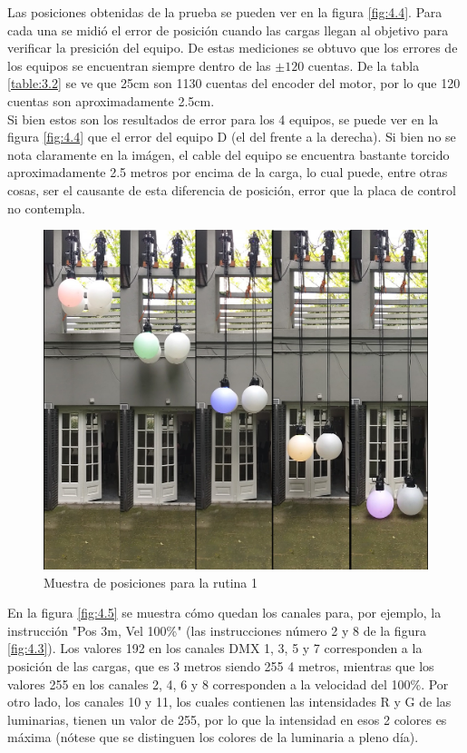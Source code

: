 Las posiciones obtenidas de la prueba se pueden ver en la figura \ref{fig:4.4}. Para cada una se midió el error de posición cuando las cargas llegan al objetivo para verificar la presición del equipo. De estas mediciones se obtuvo que los errores de los equipos se encuentran siempre dentro de las \( \pm 120 \) cuentas. De la tabla \ref{table:3.2} se ve que 25cm son 1130 cuentas del encoder del motor, por lo que 120 cuentas son aproximadamente 2.5cm.\\
Si bien estos son los resultados de error para los 4 equipos, se puede ver en la figura \ref{fig:4.4} que el error del equipo D (el del frente a la derecha). Si bien no se nota claramente en la imágen, el cable del equipo se encuentra bastante torcido aproximadamente 2.5 metros por encima de la carga, lo cual puede, entre otras cosas, ser el causante de esta diferencia de posición, error que la placa de control no contempla.

\begin{figure}[!ht]
	\centering
	\includegraphics[width=16cm,scale=1]{resources/4_4-cuelist1_resultados.jpg}
	\caption{Muestra de posiciones para la rutina 1}
	\label{fig:\thefigure}
\end{figure}

En la figura \ref{fig:4.5} se muestra cómo quedan los canales para, por ejemplo, la instrucción "Pos 3m, Vel 100\%" (las instrucciones número 2 y 8 de la figura \ref{fig:4.3}). Los valores 192 en los canales DMX 1, 3, 5 y 7 corresponden a la posición de las cargas, que es 3 metros siendo 255 4 metros, mientras que los valores 255 en los canales 2, 4, 6 y 8 corresponden a la velocidad del 100\%. Por otro lado, los canales 10 y 11, los cuales contienen las intensidades R y G de las luminarias, tienen un valor de 255, por lo que la intensidad en esos 2 colores es máxima (nótese que se distinguen los colores de la luminaria a pleno día).

